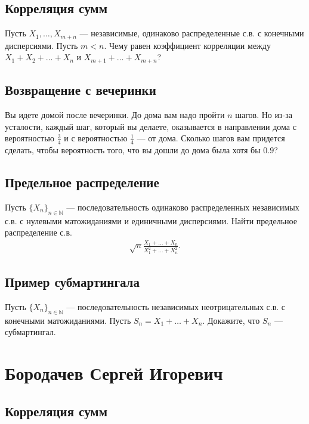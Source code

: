 \documentclass[12pt]{article}
\newcommand\N{\mathbb{N}}
\begin{document}
\subsection{Корреляция сумм}

Пусть $X_1, \dots, X_{m + n}$ --- независимые, одинаково распределенные с.в. с конечными дисперсиями. Пусть $m < n$. Чему равен коэффициент корреляции между $X_1 + X_2 + \dots + X_n$ и $X_{m + 1} + \dots + X_{m + n}$?

\subsection{Возвращение с вечеринки}

Вы идете домой после вечеринки. До дома вам надо пройти $n$ шагов. Но из-за усталости, каждый шаг, который вы делаете, оказывается в направлении дома с вероятностью $\frac{3}{4}$ и с вероятностью $\frac{1}{4}$ --- от дома. Сколько шагов вам придется сделать, чтобы вероятность того, что вы дошли до дома была хотя бы $0.9$?

\subsection{Предельное распределение}

Пусть $\{X_n\}_{n \in \N}$ --- последовательность одинаково распределенных независимых с.в. с нулевыми матожиданиями и единичными дисперсиями. Найти предельное распределение с.в.
\begin{align*}
    \sqrt{n}\frac{X_1 + \dots + X_n}{X_1^2 + \dots + X_n^2}.
\end{align*}

\subsection{Пример субмартингала}

Пусть $\{X_n\}_{n \in \N}$ --- последовательность независимых неотрицательных с.в. с конечными матожиданиями. Пусть $S_n = X_1 + \dots + X_n$. Докажите, что $S_n$ --- субмартингал.

\newpage
\section{Бородачев Сергей Игоревич}

\subsection{Корреляция сумм}
\end{document}
